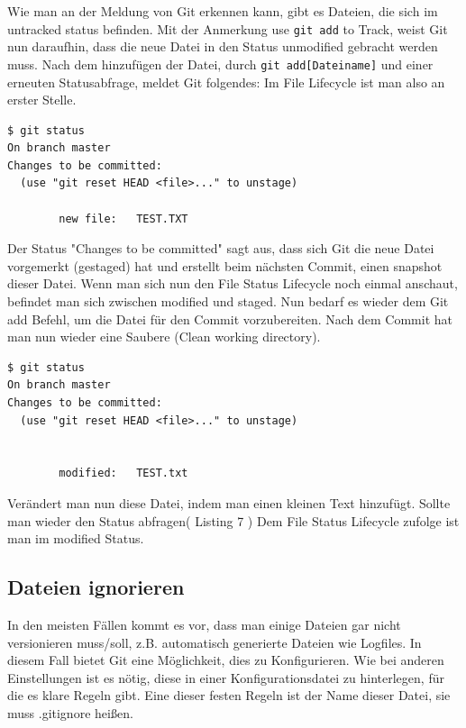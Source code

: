 \documentclass[12pt,a4paper,bibliography=totocnumbered,listof=totocnumbered]{scrartcl}
\begin{document}
Wie man an der Meldung von Git erkennen kann, gibt es Dateien, die sich im untracked status befinden. Mit der Anmerkung use \lstinline|git add| to Track, weist Git nun daraufhin, dass die neue Datei in den Status unmodified gebracht werden muss. Nach dem hinzufügen der Datei, durch \lstinline|git add[Dateiname]| und einer erneuten Statusabfrage, meldet Git folgendes:
Im File Lifecycle ist man also an erster Stelle.
\newpage
\vspace{1em}
\begin{lstlisting}[caption=Git Statusbefehl nachdem erzeugen einer Datei, label=lst:arduino]
$ git status
On branch master
Changes to be committed:
  (use "git reset HEAD <file>..." to unstage)

        new file:   TEST.TXT

\end{lstlisting}
Der Status "Changes to be committed" sagt aus, dass sich Git die neue Datei vorgemerkt (gestaged) hat und erstellt beim nächsten Commit, einen snapshot dieser Datei. Wenn man sich nun den File Status Lifecycle noch einmal anschaut, befindet man sich zwischen modified und staged. Nun bedarf es wieder dem Git add Befehl, um die Datei für den Commit vorzubereiten. Nach dem Commit hat man nun wieder eine Saubere (Clean working directory). 

\vspace{1em}
\begin{lstlisting}[caption=Git Statusbefehl nachdem verändern einer Datei, label=lst:arduino]
$ git status
On branch master
Changes to be committed:
  (use "git reset HEAD <file>..." to unstage)

      
        modified:   TEST.txt

\end{lstlisting}
Verändert man nun diese Datei, indem man einen kleinen Text hinzufügt. Sollte man wieder den Status abfragen( Listing 7 )
Dem File Status Lifecycle zufolge ist man im modified Status. 

\subsection{ Dateien ignorieren}
In den meisten Fällen kommt es vor, dass man einige Dateien gar nicht versionieren muss/soll, z.B. automatisch generierte Dateien wie Logfiles. In diesem Fall bietet Git eine Möglichkeit, dies zu Konfigurieren. Wie bei anderen Einstellungen ist es nötig, diese in einer Konfigurationsdatei zu hinterlegen, für die es klare Regeln gibt. Eine dieser festen Regeln ist der Name dieser Datei, sie muss .gitignore heißen.
\end{document}
